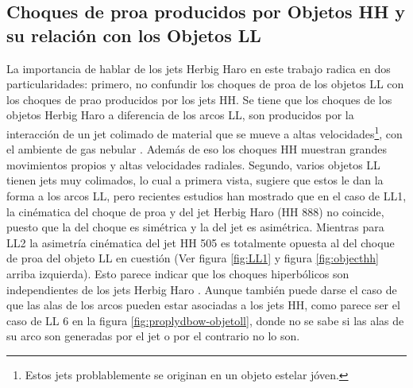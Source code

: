 \subsection{Choques de proa producidos por Objetos HH y su relación con los Objetos LL}
\label{sec:herbig}

La importancia de hablar de los jets Herbig Haro en este trabajo radica en dos particularidades: primero, no confundir los choques de proa de los objetos LL con los choques de prao producidos por los jets HH. Se tiene que los choques de los objetos Herbig Haro a diferencia de los arcos LL, son producidos por la interacción de un jet colimado de material que se mueve a altas velocidades\footnote{Estos jets problablemente se originan en un objeto estelar jóven.}, con el ambiente de gas nebular \citep{Odell:1994}. Además de eso los choques HH muestran grandes movimientos propios y altas velocidades radiales. Segundo, varios objetos LL tienen jets muy colimados, lo cual a primera vista, sugiere que estos le dan la forma a los arcos LL, pero recientes estudios han mostrado que en el caso de LL1, la cinématica del choque de proa y del jet Herbig Haro (HH 888) no coincide, puesto que la del choque es simétrica y la del jet es asimétrica. Mientras para LL2 la asimetría cinématica del jet HH 505 es totalmente opuesta al del choque de proa del objeto LL en cuestión (Ver figura \ref{fig:LL1} y figura \ref{fig:objecthh} arriba izquierda). Esto parece indicar que los choques hiperbólicos son independientes de los jets Herbig Haro \citep{Henney:2013a}. Aunque también puede darse el caso de que las alas de los arcos pueden estar asociadas a los jets HH, como parece ser el caso de LL 6 en la figura \ref{fig:proplydbow-objetoll}, donde no se sabe si las alas de su arco son generadas por el jet o por el contrario no lo son.

